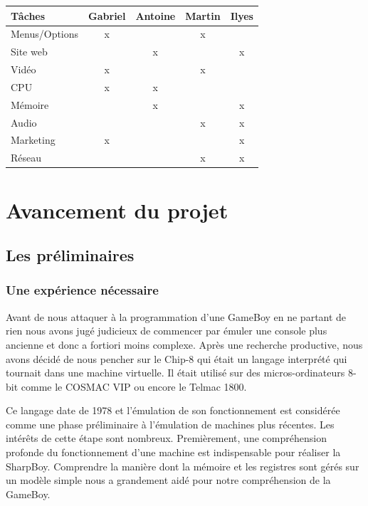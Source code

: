 \documentclass[12pt, a4paper]{article}
\begin{document}
\begin{center}
\begin{tabular}{|l|c|c|c|c|}
\hline
\bf Tâches                & \bf Gabriel   & \bf Antoine   & \bf Martin    & \bf Ilyes\\
\hline 
Menus/Options       &      x       &               &         x     &       \\
\hline 
Site web            &               &         x     &               &     x  \\
\hline 
Vidéo               &          x    &               &       x       &       \\
\hline 
CPU                 & x             & x             &               &       \\
\hline 
Mémoire             &               & x             &               &  x \\
\hline
Audio               &               &               & x             & x \\
\hline
Marketing           & x             &               &               & x \\
\hline
Réseau              &               &               & x             & x \\ 
\hline
\end{tabular}
\end{center}
\bigskip
\pagebreak

\section{Avancement du projet}
\subsection {Les préliminaires}
\subsubsection {\large Une expérience nécessaire}  
Avant de nous attaquer à la programmation d'une GameBoy en ne partant de rien nous avons jugé judicieux de commencer par émuler une console plus ancienne et donc a fortiori moins complexe. Après une recherche productive, nous avons décidé de nous pencher sur le Chip-8 qui était un langage interprété qui tournait dans une machine virtuelle. Il était utilisé sur des micros-ordinateurs 8-bit comme le COSMAC VIP ou encore le Telmac 1800.

Ce langage date de 1978 et l'émulation de son fonctionnement est considérée comme une phase préliminaire à l'émulation de machines plus récentes. Les intérêts de cette étape sont nombreux. Premièrement, une compréhension profonde du fonctionnement d'une machine est indispensable pour réaliser la SharpBoy. Comprendre la manière dont la mémoire et les registres sont gérés sur un modèle simple nous a grandement aidé pour notre compréhension de la GameBoy. 
\end{document}
